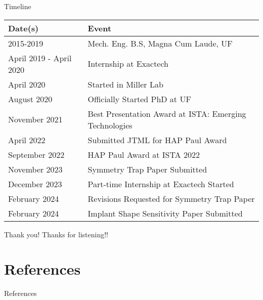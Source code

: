 \documentclass[presentation, aspectratio=1610]{beamer}
\begin{document}
\begin{frame}[label={sec:org1c1f4e8}]{Timeline}
\begin{center}
\begin{tabular}{ll}
Date(s) & Event\\
\hline
2015-2019 & Mech. Eng. B.S, Magna Cum Laude, UF\\
April 2019 - April 2020 & Internship at Exactech\\
April 2020 & Started in Miller Lab\\
August 2020 & Officially Started PhD at UF\\
November 2021 & Best Presentation Award at ISTA: Emerging Technologies\\
April 2022 & Submitted JTML for HAP Paul Award\\
September 2022 & HAP Paul Award at ISTA 2022\\
November 2023 & Symmetry Trap Paper Submitted\\
December 2023 & Part-time Internship at Exactech Started\\
February 2024 & Revisions Requested for Symmetry Trap Paper\\
February 2024 & Implant Shape Sensitivity Paper Submitted\\
\end{tabular}
\end{center}
\end{frame}
\begin{frame}[label={sec:org5f2be39}]{Thank you!}
Thanks for listening!!
\end{frame}
\section{References}
\label{sec:org1e18e5b}
\begin{frame}[label={sec:org1648d81},fragile, allowframebreaks,  label=]{References}
\printbibliography
\end{frame}
\end{document}
